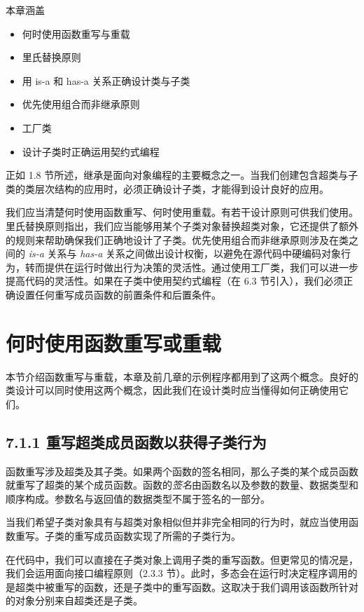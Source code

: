 \begin{myChapterIntro}{本章涵盖}
\begin{itemize}
\item 何时使用函数重写与重载
\item 里氏替换原则
\item 用 is-a 和 has-a 关系正确设计类与子类
\item 优先使用组合而非继承原则
\item 工厂类
\item 设计子类时正确运用契约式编程
\end{itemize}
\end{myChapterIntro}

正如 1.8 节所述，继承是面向对象编程的主要概念之一。当我们创建包含超类与子类的类层次结构的应用时，必须正确设计子类，才能得到设计良好的应用。


我们应当清楚何时使用函数重写、何时使用重载。有若干设计原则可供我们使用。里氏替换原则指出，我们应当能够用某个子类对象替换超类对象，它还提供了额外的规则来帮助确保我们正确地设计了子类。优先使用组合而非继承原则涉及在类之间的 \emph{is-a} 关系与 \emph{has-a} 关系之间做出设计权衡，以避免在源代码中硬编码对象行为，转而提供在运行时做出行为决策的灵活性。通过使用工厂类，我们可以进一步提高代码的灵活性。如果在子类中使用契约式编程（在 6.3 节引入），我们必须正确设置任何重写成员函数的前置条件和后置条件。

\section{何时使用函数重写或重载}

本节介绍函数重写与重载，本章及前几章的示例程序都用到了这两个概念。良好的类设计可以同时使用这两个概念，因此我们在设计类时应当懂得如何正确使用它们。

\subsection{7.1.1 重写超类成员函数以获得子类行为}

函数重写涉及超类及其子类。如果两个函数的签名相同，那么子类的某个成员函数就重写了超类的某个成员函数。函数的\emph{签名}由函数名以及参数的数量、数据类型和顺序构成。参数名与返回值的数据类型不属于签名的一部分。

当我们希望子类对象具有与超类对象相似但并非完全相同的行为时，就应当使用函数重写。子类的重写成员函数实现了所需的子类行为。

在代码中，我们可以直接在子类对象上调用子类的重写函数。但更常见的情况是，我们会运用面向接口编程原则（2.3.3 节）。此时，多态会在运行时决定程序调用的是超类中被重写的函数，还是子类中的重写函数。这取决于我们调用该函数所针对的对象分别来自超类还是子类。

